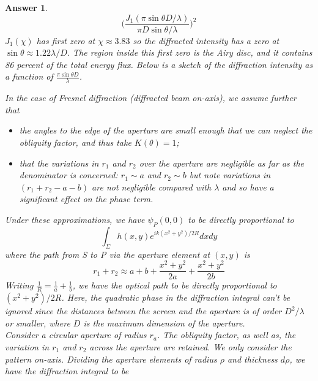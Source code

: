 \documentclass[a4paper]{article}
\newtheorem{ans}{Answer}[subsection]
\theoremstyle{new}
\begin{document}
\begin{ans}
$$\bigg(\frac{J_1(\pi\sin\theta D/\lambda)}{\pi D\sin\theta/\lambda}\bigg)^2$$
$J_1(\chi)$ has first zero at $\chi\approx3.83$ so the diffracted intensity has a zero at $\sin\theta\approx1.22\lambda/D$. The region inside this first zero is the Airy disc, and it contains 86 percent of the total energy flux. Below is a sketch of the diffraction intensity as a function of $\frac{\pi\sin\theta D}{\lambda}$.
\begin{center}
\end{center}
In the case of Fresnel diffraction (diffracted beam on-axis), we assume further that
\begin{itemize}
    \item the angles to the edge of the aperture are small enough that we can neglect the obliquity factor, and thus take $K(\theta)=1$;
    \item that the variations in $r_1$ and $r_2$ over the aperture are negligible as far as the denominator is concerned: $r_1\sim a$ and $r_2\sim b$ but note variations in $(r_1+r_2-a-b)$ are not negligible compared with $\lambda$ and so have a significant effect on the phase term.
\end{itemize}
Under these approximations, we have $\psi_P(0,0)$ to be directly proportional to
$$\int_\Sigma h(x,y)e^{ik(x^2+y^2)/2R}dxdy$$
where the path from S to P via the aperture element at $(x,y)$ is
$$r_1+r_2\approx a+b+\frac{x^2+y^2}{2a}+\frac{x^2+y^2}{2b}$$
Writing $\frac{1}{R}=\frac{1}{a}+\frac{1}{b}$, we have the optical path to be directly proportional to $(x^2+y^2)/2R$. Here, the quadratic phase in the diffraction integral can't be ignored since the distances between the screen and the aperture is of order $D^2/\lambda$ or smaller, where $D$ is the maximum dimension of the aperture.\\[5pt]
Consider a circular aperture of radius $r_a$. The obliquity factor, as well as, the variation in $r_1$ and $r_2$ across the aperture are retained. We only consider the pattern on-axis. Dividing the aperture elements of radius $\rho$ and thickness $d\rho$, we have the diffraction integral to be

\end{ans}
\end{document}
